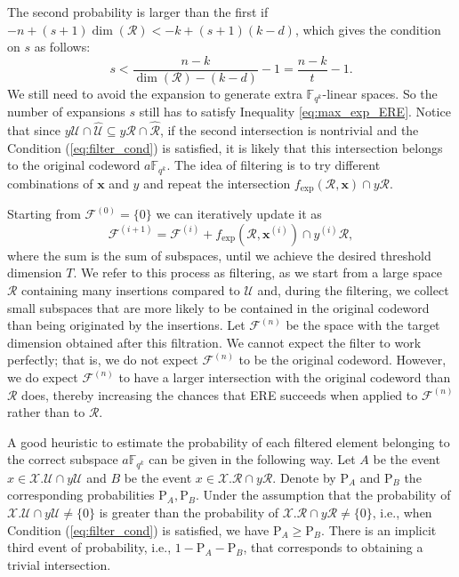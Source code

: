 \documentclass{article}
\newcommand{\Fqk}{\mathbb{F}_{q^k}}
\newcommand{\calF}{\mathcal{F}}
\newcommand{\calR}{\mathcal{R}}
\newcommand{\calU}{\mathcal{U}}
\newcommand{\calX}{\mathcal{X}}
\newcommand{\fexp}{f_{\mathrm{exp}}}
\newcommand{\pr}{\mathrm{P}}
\begin{document}
The second probability is larger than the first if
$
    -n + (s+1)\dim(\calR) < - k+ (s+1)(k-d)
$,
which gives the condition on $s$ as follows:
\begin{equation}
    \label{eq:filter_cond}
    s < \frac{n-k}{\dim(\calR)-(k-d)} - 1 = \frac{n-k}{t} - 1.
\end{equation}
We still need to avoid the expansion to generate extra $\Fqk$-linear spaces. So the number of expansions $s$ still has to satisfy Inequality \eqref{eq:max_exp_ERE}.
Notice that since $y\calU \cap \hat{\calU} \subseteq y\calR \cap \hat{\calR}$, if the second intersection is nontrivial and the Condition (\ref{eq:filter_cond}) is satisfied, it is likely that this intersection belongs to the original codeword $a \Fqk$.
The idea of filtering is to try different combinations of $\bm x$ and $y$ and repeat the intersection $\fexp(\calR,\bm x) \cap y \calR.$
\par Starting from $\calF^{(0)} = \{0\}$ we can iteratively update it as
$$
    \calF^{(i+1)} = \calF^{(i)} + \fexp(\calR, \bm x^{(i)}) \cap y^{(i)} \calR,
$$
where the sum is the sum of subspaces, until we achieve the desired threshold dimension $T$.
We refer to this process as filtering, as we start from a large space $\calR$ containing many insertions compared to $\calU$ and, during the filtering, we collect small subspaces that are more likely to be contained in the original codeword than being originated by the insertions.
Let $\calF^{(n)}$ be the space with the target dimension obtained after this filtration.
We cannot expect the filter to work perfectly; that is, we do not expect $\calF^{(n)}$ to be the original codeword. However, we do expect $\calF^{(n)}$ to have a larger intersection with the original codeword than $\calR$ does, thereby increasing the chances that ERE succeeds when applied to $\calF^{(n)}$ rather than to $\calR$.
\par A good heuristic to estimate the probability of each filtered element belonging to the correct subspace $a \Fqk$ can be given in the following way. 
Let $A$ be the event $x \in \calX.\calU \cap y \calU$ and $B$ be the event $x \in \calX.\calR \cap y \calR$. 
Denote by $\pr_A$ and $\pr_B$ the corresponding probabilities $\pr_A, \pr_B$. Under the assumption that the probability of $\calX.\calU \cap y\calU \neq \{0\}$ is greater than the probability of $\calX.\calR \cap y\calR \neq \{0\}$, i.e., when Condition (\ref{eq:filter_cond}) is satisfied, we have $\pr_A \geq \pr_B.$ 
There is an implicit third event of probability, i.e., $1 - \pr_A - \pr_B$, that corresponds to obtaining a trivial intersection.
\end{document}
